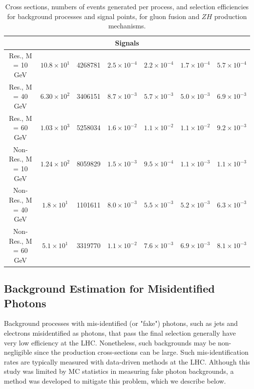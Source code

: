 \documentclass[11pt]{article}
\begin{document}
\begin{table}[]
{\begin{tabular}{| c | c | c | c | c | c| c| }
\hline
\multicolumn{7}{|c|}{Signals} \\
\hline
Res., M = 10 GeV     &  $10.8\times10^{1}$   &    4268781    &  $2.5\times10^{-4}$   &  $2.2\times10^{-4}$   &  $1.7\times10^{-4}$   &  $5.7\times10^{-4}$       \\
Res., M = 40 GeV     &  $6.30\times10^{2}$   &    3406151    &  $8.7\times10^{-3}$   &  $5.7\times10^{-3}$   &  $5.0\times10^{-3}$   &  $6.9\times10^{-3}$      \\
Res., M = 60 GeV     &  $1.03\times10^{3}$    &    5258034    & $1.6\times10^{-2}$    & $1.1\times10^{-2}$    & $1.1\times10^{-2}$    & $9.2\times10^{-3}$         \\
Non-Res., M = 10 GeV &  $1.24\times10^{2}$   &    8059829    &  $1.5\times10^{-3}$   &  $9.5\times10^{-4}$   &  $1.1\times10^{-3}$   &  $1.1\times10^{-3}$       \\
Non-Res., M = 40 GeV &  $1.8\times10^{1}$  &    1101611    &    $8.0\times10^{-3}$ &    $5.5\times10^{-3}$ &    $5.2\times10^{-3}$ &    $6.3\times10^{-3}$     \\
Non-Res., M = 60 GeV &  $5.1\times10^{1}$  &    3319770    &    $1.1\times10^{-2}$ &    $7.6\times10^{-3}$ &    $6.9\times10^{-3}$ &    $8.1\times10^{-3}$     \\
\hline
\end{tabular}
}
\caption{Cross sections, numbers of events generated per process, and selection efficiencies for background processes and signal points, for gluon fusion and $ZH$ production mechanisms.}
\label{tab:sel_eff}
\end{table}

\subsection{Background Estimation for Misidentified Photons}

Background processes with mis-identified (or "fake") photons, such as jets and electrons misidentified as photons, that pass the final selection generally have very low efficiency at the LHC. Nonetheless, such backgrounds may be non-negligible since the production cross-sections can be large. Such mis-identification rates are typically measured with data-driven methods at the LHC.
%
Although this study was limited by MC statistics in measuring fake photon backgrounds, a method was developed to mitigate this problem, which we describe below.
\end{document}
